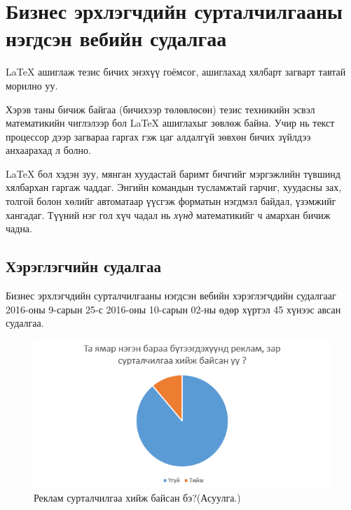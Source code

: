 
\chapter{Бизнес эрхлэгчдийн сурталчилгааны нэгдсэн вебийн судалгаа} %
\label{Chapter1} %


\newcommand{\keyword}[1]{\textbf{#1}}
\newcommand{\tabhead}[1]{\textbf{#1}}
\newcommand{\code}[1]{\texttt{#1}}
\newcommand{\file}[1]{\texttt{\bfseries#1}}
\newcommand{\option}[1]{\texttt{\itshape#1}}


\LaTeX{} ашиглаж тезис бичих энэхүү гоёмсог, ашиглахад хялбарт загварт тавтай морилно уу. 

Хэрэв таны бичиж байгаа (бичихээр төлөвлөсөн) тезис техникийн эсвэл математикийн чиглэлээр бол \LaTeX{} ашиглахыг зөвлөж байна. Учир нь текст процессор дээр загвараа гаргах гэж цаг алдалгүй зөвхөн бичих зүйлдээ анхаарахад л болно.

\LaTeX{} бол хэдэн зуу, мянган хуудастай баримт бичгийг мэргэжлийн түвшинд хялбархан гаргаж чаддаг. Энгийн командын тусламжтай гарчиг, хуудасны зах, толгой болон хөлийг автоматаар үүсгэж форматын нэгдмэл байдал, үзэмжийг хангадаг. Түүний нэг гол хүч чадал нь \emph{хүнд} математикийг ч амархан бичиж чадна.

\section{Хэрэглэгчийн судалгаа}
Бизнес эрхлэгчдийн сурталчилгааны нэгдсэн вебийн хэрэглэгчдийн судалгааг 2016-оны 9-сарын 25-с 2016-оны 10-сарын 02-ны өдөр хүртэл 45 хүнээс авсан судалгаа.
\begin{figure}[htbp]
	\centering
	\includegraphics[scale=0.7]{Chart/Chart1}
	\caption[Хэрэглэгчийн судалгаа]{Реклам сурталчилгаа хийж байсан бэ?(Асуулга.)}
	\label{fig:Chart1}
\end{figure}

